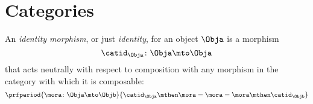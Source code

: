 


%
%

\section{Categories}

\begin{ctdefinition}
    \label{def:identity-morphism}
    An \emph{identity morphism}, or just \emph{identity}, for an object $\Obja$
    is a morphism
    \begin{equation}
        \catid_{\Obja}\colon \Obja \mto \Obja
    \end{equation}
    that acts neutrally with respect to composition with any morphism in the category with which it is composable:
    \begin{equation}
        \prfperiod{
            \mora \colon \Obja \mto \Objb
        }{
            \catid_\Obja \mthen \mora= \mora = \mora \mthen \catid_\Objb
        }
    \end{equation}
\end{ctdefinition}

